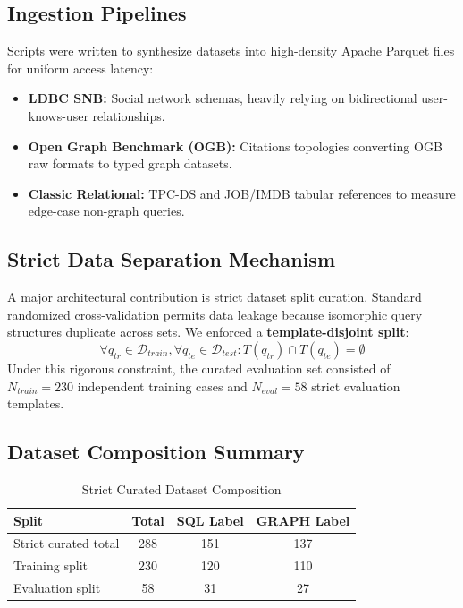 \documentclass[conference]{IEEEtran}
\begin{document}
\subsection{Ingestion Pipelines}
Scripts were written to synthesize datasets into high-density Apache Parquet files for uniform access latency:
\begin{itemize}[leftmargin=*]
\item \textbf{LDBC SNB:} Social network schemas, heavily relying on bidirectional user-knows-user relationships.
\item \textbf{Open Graph Benchmark (OGB):} Citations topologies converting OGB raw formats to typed graph datasets.
\item \textbf{Classic Relational:} TPC-DS and JOB/IMDB tabular references to measure edge-case non-graph queries.
\end{itemize}

\subsection{Strict Data Separation Mechanism}
A major architectural contribution is strict dataset split curation. Standard randomized cross-validation permits data leakage because isomorphic query structures duplicate across sets. We enforced a \textbf{template-disjoint split}:
\begin{equation}
\forall q_{tr} \in \mathcal{D}_{train}, \forall q_{te} \in \mathcal{D}_{test} : T(q_{tr}) \cap T(q_{te}) = \emptyset
\end{equation}
Under this rigorous constraint, the curated evaluation set consisted of $N_{train}=230$ independent training cases and $N_{eval}=58$ strict evaluation templates.

\subsection{Dataset Composition Summary}
\begin{table}[h]
\centering
\caption{Strict Curated Dataset Composition}
\label{tab:data_composition}
\begin{tabular}{lccc}
\toprule
Split & Total & SQL Label & GRAPH Label \\
\midrule
Strict curated total & 288 & 151 & 137 \\
Training split & 230 & 120 & 110 \\
Evaluation split & 58 & 31 & 27 \\
\bottomrule
\end{tabular}
\end{table}
\end{document}
